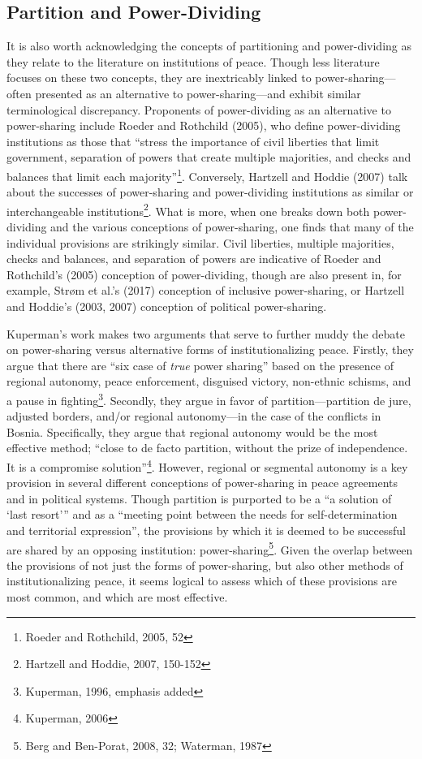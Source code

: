 \documentclass[12pt]{article}
\begin{document}
\subsection{Partition and Power-Dividing}
It is also worth acknowledging the concepts of partitioning and power-dividing as they relate to the literature on institutions of peace. Though less literature focuses on these two concepts, they are inextricably linked to power-sharing---often presented as an alternative to power-sharing---and exhibit similar terminological discrepancy. Proponents of power-dividing as an alternative to power-sharing include Roeder and Rothchild (2005), who define power-dividing institutions as those that ``stress the importance of civil liberties that limit government, separation of powers that create multiple majorities, and checks and balances that limit each majority''\footnote{Roeder and Rothchild, 2005, 52}. Conversely, Hartzell and Hoddie (2007) talk about the successes of power-sharing and power-dividing institutions as similar or interchangeable institutions\footnote{Hartzell and Hoddie, 2007, 150-152}. What is more, when one breaks down both power-dividing and the various conceptions of power-sharing, one finds that many of the individual provisions are strikingly similar. Civil liberties, multiple majorities, checks and balances, and separation of powers are indicative of Roeder and Rothchild’s (2005) conception of power-dividing, though are also present in, for example, Strøm et al.’s (2017) conception of inclusive power-sharing, or Hartzell and Hoddie’s (2003, 2007) conception of political power-sharing. 

Kuperman’s work makes two arguments that serve to further muddy the debate on power-sharing versus alternative forms of institutionalizing peace. Firstly, they argue that there are ``six case of \textit{true} power sharing'' based on the presence of regional autonomy, peace enforcement, disguised victory, non-ethnic schisms, and a pause in fighting\footnote{Kuperman, 1996, emphasis added}. Secondly, they argue in favor of partition—partition de jure, adjusted borders, and/or regional autonomy—in the case of the conflicts in Bosnia. Specifically, they argue that regional autonomy would be the most effective method; ``close to de facto partition, without the prize of independence. It is a compromise solution''\footnote{Kuperman, 2006}. However, regional or segmental autonomy is a key provision in several different conceptions of power-sharing in peace agreements and in political systems. Though partition is purported to be a ``a solution of ‘last resort’'' and as a ``meeting point between the needs for self-determination and territorial expression'', the provisions by which it is deemed to be successful are shared by an opposing institution: power-sharing\footnote{Berg and Ben-Porat, 2008, 32; Waterman, 1987}. Given the overlap between the provisions of not just the forms of power-sharing, but also other methods of institutionalizing peace, it seems logical to assess which of these provisions are most common, and which are most effective. 
\end{document}
